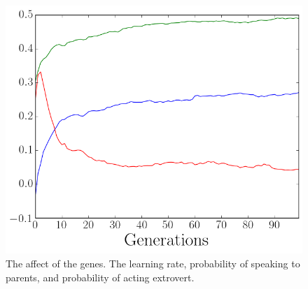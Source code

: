 \begin{figure}[htbp]
    \centering
    \includegraphics[scale=0.5]{fig/Results/Exp1/Genes1}
    \caption{The affect of the genes. The learning rate, probability of speaking to parents, and probability of acting extrovert.}
    \label{fig:Genes}
\end{figure}

